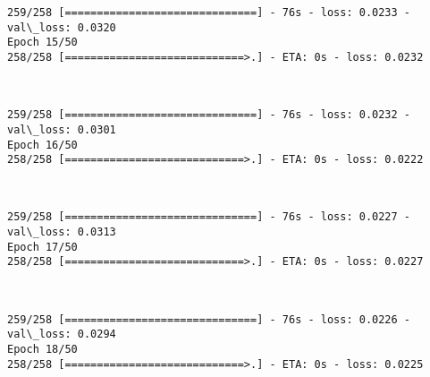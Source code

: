 \documentclass[11pt]{article}
\begin{document}
    \begin{Verbatim}[commandchars=\\\{\}]
259/258 [==============================] - 76s - loss: 0.0233 - val\_loss: 0.0320
Epoch 15/50
258/258 [============================>.] - ETA: 0s - loss: 0.0232
    \end{Verbatim}

    \begin{center}
    \end{center}
    { \hspace*{\fill} \\}
    
    \begin{Verbatim}[commandchars=\\\{\}]
259/258 [==============================] - 76s - loss: 0.0232 - val\_loss: 0.0301
Epoch 16/50
258/258 [============================>.] - ETA: 0s - loss: 0.0222
    \end{Verbatim}

    \begin{center}
    \end{center}
    { \hspace*{\fill} \\}
    
    \begin{Verbatim}[commandchars=\\\{\}]
259/258 [==============================] - 76s - loss: 0.0227 - val\_loss: 0.0313
Epoch 17/50
258/258 [============================>.] - ETA: 0s - loss: 0.0227
    \end{Verbatim}

    \begin{center}
    \end{center}
    { \hspace*{\fill} \\}
    
    \begin{Verbatim}[commandchars=\\\{\}]
259/258 [==============================] - 76s - loss: 0.0226 - val\_loss: 0.0294
Epoch 18/50
258/258 [============================>.] - ETA: 0s - loss: 0.0225
    \end{Verbatim}

    \begin{center}
    \end{center}
    { \hspace*{\fill} \\}
    
\end{document}
